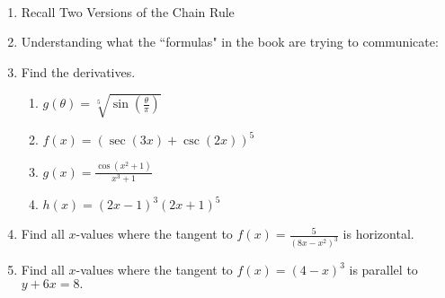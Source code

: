\documentclass[11pt,fleqn]{article}
\begin{document}
\renewcommand{\headrulewidth}{0pt}
\newcommand{\blank}[1]{\rule{#1}{0.75pt}}
\newcommand{\bc}{\begin{center}}
\newcommand{\ec}{\end{center}}
\renewcommand{\d}{\displaystyle}

\vspace*{-0.7in}

\begin{center}
  \large
  \\
\end{center}
\begin{enumerate}
\item Recall Two Versions of the Chain Rule
\vspace{1in}
\item Understanding what the ``formulas" in the book are trying to communicate:
\vspace{2in}	
\item Find the derivatives.
	\begin{enumerate}
	\item $g(\theta)=\sqrt[5]{\sin(\frac{\theta}{\pi})}$
	\vfill
	\item $f(x)=(\sec(3x)+\csc(2x))^5$
	\vfill
	\item $g(x)=\frac{\cos(x^2+1)}{x^3+1}$
	\vfill
\newpage
	\item $h(x)=(2x-1)^3(2x+1)^5$
	\vfill
	\end{enumerate}

\item Find all $x$-values where the tangent to $f(x)=\frac{5}{(8x-x^2)^3}$ is horizontal.

\vfill

\item Find all $x$-values where the tangent to $f(x)=(4-x)^3$ is parallel to $y+6x=8.$
\vfill


\end{enumerate}
\end{document}
